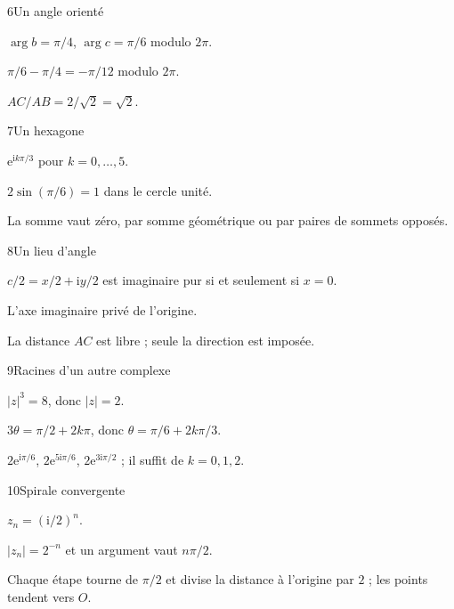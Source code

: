 \begin{corrige}{6}{Un angle orienté}
\begin{questions}
\item $\arg b=\pi/4$, $\arg c=\pi/6$ modulo $2\pi$.
\item $\pi/6-\pi/4=-\pi/12$ modulo $2\pi$.
\item $AC/AB=2/\sqrt2=\sqrt2$.
\end{questions}
\end{corrige}
\begin{corrige}{7}{Un hexagone}
\begin{questions}
\item $\mathrm e^{\mathrm ik\pi/3}$ pour $k=0,\ldots,5$.
\item $2\sin(\pi/6)=1$ dans le cercle unité.
\item La somme vaut zéro, par somme géométrique ou par paires de sommets opposés.
\end{questions}
\end{corrige}
\begin{corrige}{8}{Un lieu d’angle}
\begin{questions}
\item $c/2=x/2+\mathrm iy/2$ est imaginaire pur si et seulement si $x=0$.
\item L’axe imaginaire privé de l’origine.
\item La distance $AC$ est libre ; seule la direction est imposée.
\end{questions}
\end{corrige}
\begin{corrige}{9}{Racines d’un autre complexe}
\begin{questions}
\item $|z|^3=8$, donc $|z|=2$.
\item $3\theta=\pi/2+2k\pi$, donc $\theta=\pi/6+2k\pi/3$.
\item $2\mathrm e^{\mathrm i\pi/6}$, $2\mathrm e^{5\mathrm i\pi/6}$, $2\mathrm e^{3\mathrm i\pi/2}$ ; il suffit de $k=0,1,2$.
\end{questions}
\end{corrige}
\begin{corrige}{10}{Spirale convergente}
\begin{questions}
\item $z_n=(\mathrm i/2)^n$.
\item $|z_n|=2^{-n}$ et un argument vaut $n\pi/2$.
\item Chaque étape tourne de $\pi/2$ et divise la distance à l’origine par $2$ ; les points tendent vers $O$.
\end{questions}
\end{corrige}
